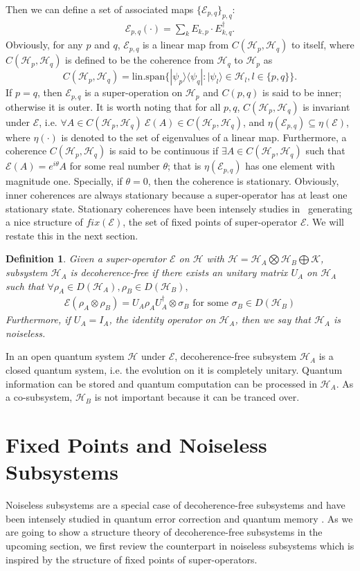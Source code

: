 \documentclass[journal]{IEEEtran}
\def\h{\ensuremath{\mathcal{H}}}
\def\k{\ensuremath{\mathcal{K}}}
\def\e{\ensuremath{\mathcal{E}}}
\def\k{\mathcal{K}}
\newtheorem{definition}{Definition}
\begin{document}
Then we can define a set of associated maps $\{\e_{p,q}\}_{p,q}$:
\begin{eqnarray}\label{Eq_ass_maps}
  \e_{p,q}(\cdot)=\sum_{k} E_{k,p}\cdot E_{k,q}^\dagger.
\end{eqnarray}
Obviously, for any $p$ and $q$, $\e_{p,q}$ is a linear  map from $C(\h_p,\h_q)$ to itself, where $C(\h_p,\h_q)$ is defined to be the coherence from $\h_q$ to $\h_p$ as
$$C(\h_p,\h_q)=\textrm{lin.span}\{|\psi_{p}\rangle\langle\psi_q | : |\psi_{l}\rangle\in \h_{l}, l\in\{p,q\}\}.$$
If $p=q$, then $\e_{p,q}$ is a super-operation on $\h_p$ and $C(p,q)$ is said to be inner; otherwise it is outer. It is worth  noting that for all $p,q$, $C(\h_p,\h_q)$ is invariant under $\e$, i.e. $\forall  A\in C(\h_p,\h_q) \ \e(A)\in C(\h_p,\h_q)$, and  $\eta(\e_{p,q})\subseteq \eta(\e)$, where $\eta(\cdot)$ is denoted to the set of eigenvalues of a linear map.
Furthermore, a coherence $C(\h_p,\h_q)$ is said to be continuous  if $\exists A\in C(\h_p,\h_q)$ such that $\e(A)=e^{i\theta}A$ for some real number $\theta$; that is $\eta(\e_{p,q})$ has one element with magnitude one.  Specially, if $\theta=0$, then the coherence is stationary. Obviously, inner coherences are always stationary because a super-operator has at least one stationary state. Stationary coherences have been intensely studies in~\cite{baumgartner2012structure} generating a nice structure of $fix(\e)$, the set of fixed points of super-operator $\e$. We will restate this in the next section.
\begin{definition}\label{def_dfs}
  Given a super-operator $\e$ on $\h$ with $\h=\h_A\bigotimes \h_B\bigoplus\k$, subsystem $\h_A$ is decoherence-free if there exists an unitary matrix $U_A$ on $\h_A$ such that $\forall \rho_A\in D(\h_A), \rho_B\in D(\h_B),$
  \begin{eqnarray}\label{eq_dfs_def}
    \e(\rho_A\otimes\rho_B)=U_A\rho_{A}U_A^\dagger\otimes \sigma_B \textrm{ for some } \sigma_B\in D(\h_B)
  \end{eqnarray}
  Furthermore, if $U_A=I_A$, the identity operator on $\h_A$, then we say that $\h_A$ is noiseless.  
\end{definition}

In an open quantum system $\h$ under $\e$, decoherence-free subsystem $\h_A$ is a closed quantum system, i.e. the evolution on it  is completely unitary. Quantum information can be stored and quantum  computation can be processed in $\h_A$. As a co-subsystem, $\h_B$ is not important because it can be tranced over.
\section{Fixed Points and Noiseless Subsystems}
Noiseless subsystems are a special case of decoherence-free subsystems and have been intensely studied in quantum error correction \cite{kribs2005operator,beny2007generalization} and quantum memory \cite{kuperberg2003capacity}. As we are going to show a structure theory of decoherence-free subsystems in the upcoming section, we first  review the counterpart in noiseless subsystems which is inspired by the structure of fixed points of super-operators. 
\end{document}
